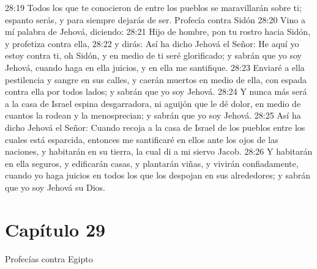 28:19 Todos los que te conocieron de entre los pueblos se maravillarán sobre ti; espanto serás, y para siempre dejarás de ser. 
Profecía contra Sidón   
28:20 Vino a mí palabra de Jehová, diciendo:   
28:21 Hijo de hombre, pon tu rostro hacia Sidón,  y profetiza contra ella,   
28:22 y dirás: Así ha dicho Jehová el Señor: He aquí yo estoy contra ti, oh Sidón, y en medio de ti seré glorificado; y sabrán que yo soy Jehová, cuando haga en ella juicios, y en ella me santifique.   
28:23 Enviaré a ella pestilencia y sangre en sus calles, y caerán muertos en medio de ella, con espada contra ella por todos lados; y sabrán que yo soy Jehová.   
28:24 Y nunca más será a la casa de Israel espina desgarradora, ni aguijón que le dé dolor, en medio de cuantos la rodean y la menosprecian; y sabrán que yo soy Jehová.   
28:25 Así ha dicho Jehová el Señor: Cuando recoja a la casa de Israel de los pueblos entre los cuales está esparcida, entonces me santificaré en ellos ante los ojos de las naciones, y habitarán en su tierra, la cual di a mi siervo Jacob.   
28:26 Y habitarán en ella seguros, y edificarán casas, y plantarán viñas, y vivirán confiadamente, cuando yo haga juicios en todos los que los despojan en sus alrededores; y sabrán que yo soy Jehová su Dios.   
\section*{Capítulo 29  }
Profecías contra Egipto   
  
